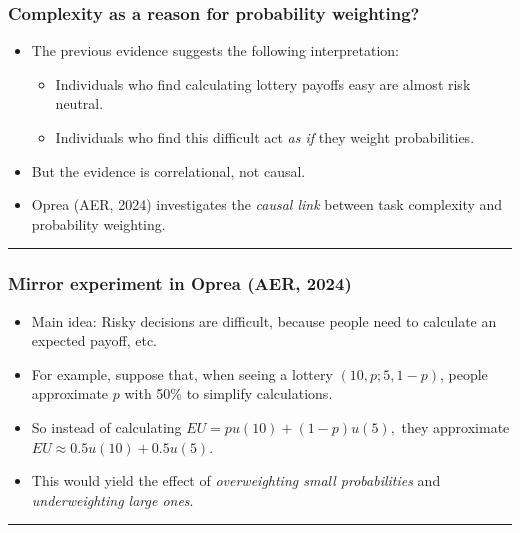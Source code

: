 \documentclass[
  letterpaper,
  DIV=11,
  numbers=noendperiod]{scrartcl}
\providecommand{\tightlist}{%
  \setlength{\itemsep}{0pt}\setlength{\parskip}{0pt}}\usepackage{longtable,booktabs,array}
\begin{document}
\subsubsection{Complexity as a reason for probability
weighting?}\label{complexity-as-a-reason-for-probability-weighting}

\begin{itemize}
\tightlist
\item
  The previous evidence suggests the following interpretation:

  \begin{itemize}
  \tightlist
  \item
    Individuals who find calculating lottery payoffs easy are almost
    risk neutral.
  \item
    Individuals who find this difficult act \emph{as if} they weight
    probabilities.
  \end{itemize}
\item
  But the evidence is correlational, not causal.
\item
  Oprea (AER, 2024) investigates the \emph{causal link} between task
  complexity and probability weighting.
\end{itemize}

\begin{center}\rule{0.5\linewidth}{0.5pt}\end{center}

\subsubsection{Mirror experiment in Oprea (AER,
2024)}\label{mirror-experiment-in-oprea-aer-2024}

\begin{itemize}
\tightlist
\item
  Main idea: Risky decisions are difficult, because people need to
  calculate an expected payoff, etc.
\item
  For example, suppose that, when seeing a lottery \((10, p; 5, 1-p)\),
  people approximate \(p\) with 50\% to simplify calculations.
\item
  So instead of calculating \(EU = p u(10)+ (1-p)u(5),\) they
  approximate \(EU\approx 0.5 u(10) + 0.5 u(5).\)
\item
  This would yield the effect of \emph{overweighting small
  probabilities} and \emph{underweighting large ones}.
\end{itemize}

\begin{center}\rule{0.5\linewidth}{0.5pt}\end{center}
\end{document}
